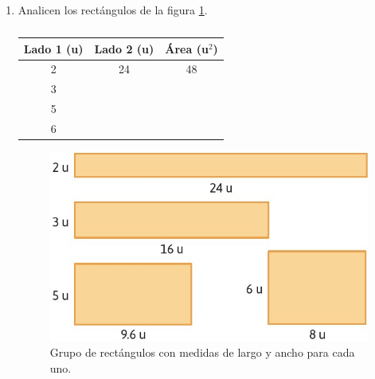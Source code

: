 \documentclass[11pt]{book}
\begin{document}
\begin{boxK}
\begin{enumerate}
    \item Analicen los rectángulos de la figura \ref{fig:rectangulos}.

          \begin{minipage}[t]{.45\textwidth}
            \begin{table}[H]
              \centering
              \begin{tabular}{|c|c|c|}
                \hline
                Lado 1 (u) & Lado 2 (u) & Área (u$^2$) \\
                \hline\rowcolor{colorrds!10}
                2          & 24         & 48           \\
                \hline
                3          &            &              \\
                \hline\rowcolor{colorrds!10}
                5          &            &              \\
                \hline
                6          &            &              \\
                \hline
              \end{tabular}
              \caption{}
              \label{tab:rectangulos}
            \end{table}
          \end{minipage}%
          \begin{minipage}[t]{.45\textwidth}
            \begin{figure}[H]
              \centering
              \includegraphics[width=\linewidth]{ejem10.2}
              \caption{Grupo de rect\'angulos con medidas de largo y ancho para cada uno.}
              \label{fig:rectangulos}
            \end{figure}
          \end{minipage}


\end{enumerate}
\end{boxK}
\end{document}
